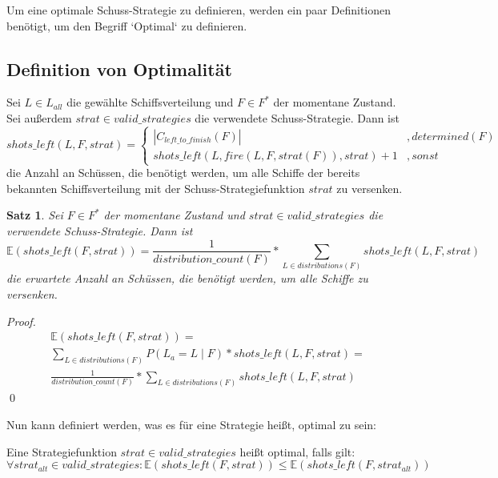 \documentclass[a4paper,12pt]{llncs}
\numberwithin{equation}{section}
\newtheorem{satz}{Satz}
\begin{document}
Um eine optimale Schuss-Strategie zu definieren, werden ein paar Definitionen benötigt, um den Begriff `Optimal` zu definieren.

\subsection{Definition von Optimalität}

\begin{definition}
Sei $L\in L_{all}$ die gewählte Schiffsverteilung und $F\in F^*$ der momentane Zustand.
Sei außerdem $strat \in valid\_strategies$ die verwendete Schuss-Strategie.
Dann ist
\[
shots\_left(L, F, strat)=
  \begin{cases} 
  	|C_{left\_to\_finish}(F)|& ,determined(F) \\
      shots\_left(L, fire(L, F, strat(F)), strat) + 1 & ,sonst
   \end{cases}
\]
die Anzahl an Schüssen, die benötigt werden, um alle Schiffe der bereits bekannten Schiffsverteilung mit der Schuss-Strategiefunktion $strat$ zu versenken.
\end{definition}

\begin{satz}
Sei $F\in F^*$ der momentane Zustand und $strat \in valid\_strategies$ die verwendete Schuss-Strategie.
Dann ist
\[
\mathds{E}(shots\_left(F, strat))=\frac{1}{distribution\_count(F)} * \sum_{L \in distributions(F)}{shots\_left(L, F, strat)}
\]
die erwartete Anzahl an Schüssen, die benötigt werden, um alle Schiffe zu versenken.
\end{satz}

\begin{proof}
\begin{align}
\mathds{E}(shots\_left(F, strat))=\\
\sum_{L \in distributions(F)}{P(L_a= L \mid F) * shots\_left(L, F, strat)} =\\
\frac{1}{distribution\_count(F)} * \sum_{L \in distributions(F)}{shots\_left(L, F, strat)}
\end{align}
\qed
\end{proof}

Nun kann definiert werden, was es für eine Strategie heißt, optimal zu sein:
\begin{definition}
Eine Strategiefunktion $strat \in valid\_strategies$ heißt optimal, falls gilt:
\[
\forall strat_{alt} \in valid\_strategies \colon \mathds{E}(shots\_left(F, strat)) \leq \mathds{E}(shots\_left(F, strat_{alt}))
\]
\end{definition}
\end{document}
